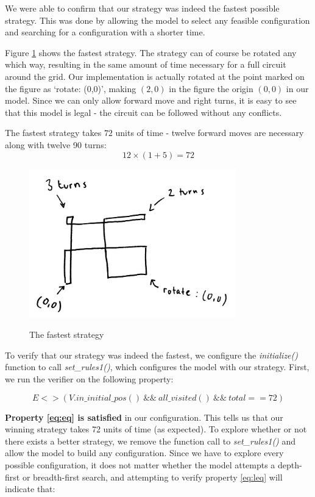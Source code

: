 \documentclass{article}
\begin{document}
We were able to confirm that our strategy was indeed the fastest possible strategy. This was done by allowing the model to select any feasible configuration and searching for a configuration with a shorter time.

Figure \ref{fig:strategy} shows the fastest strategy. The strategy can of course be rotated any which way, resulting in the same amount of time necessary for a full circuit around the grid.
Our implementation is actually rotated at the point marked on the figure as `rotate: (0,0)', making $(2,0)$ in the figure the origin $(0,0)$ in our model.
Since we can only allow forward move and right turns, it is easy to see that this model is legal
\-- the circuit can be followed without any conflicts.

The fastest strategy takes $72$ units of time \-- twelve forward moves are necessary along with twelve 90\degree{} turns:
\[ 12 \times ( 1 + 5 ) = 72 \]

\begin{figure}[h!]
	\caption{The fastest strategy}
	\centering
	\includegraphics[width=0.8\textwidth]{strategy.png}
	\label{fig:strategy}
\end{figure}

To verify that our strategy was indeed the fastest, we configure the \textit{initialize()} function to call \textit{set\_rules1()}, which configures the model with our strategy.
First, we run the verifier on the following property:

\begin{equation}
	\label{eq:eq}
	E<>(V.in\_initial\_pos() ~ \&\& ~ all\_visited() ~ \&\& ~ total ==  72)
\end{equation}

\textbf{Property \ref{eq:eq} is satisfied} in our configuration.
This tells us that our winning strategy takes 72 units of time (as expected).
To explore whether or not there exists a better strategy, we remove the function call to \textit{set\_rules1()} and allow the model to build any configuration.
Since we have to explore every possible configuration, it does not matter whether the model attempts a depth-first or breadth-first search, and attempting to verify property \ref{eq:leq} will indicate that:
\end{document}
